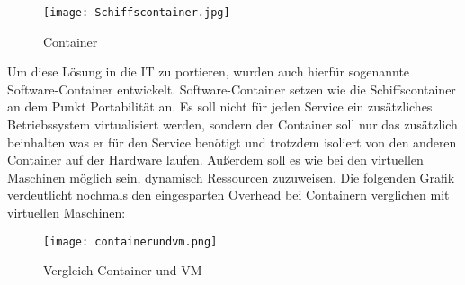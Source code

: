 \begin{figure}[H]
	\begin{center}
		\texttt{[image: Schiffscontainer.jpg]}
	\end{center}
	\caption[Container]{Container \footnotemark}
	\label{fig:HW1}
\end{figure}
Um diese Lösung in die IT zu portieren, wurden auch hierfür sogenannte Software-Container entwickelt.
Software-Container setzen wie die Schiffscontainer an dem Punkt Portabilität an. Es soll nicht für jeden Service ein zusätzliches Betriebssystem virtualisiert werden, sondern der Container soll nur das zusätzlich beinhalten was er für den Service benötigt und trotzdem isoliert von den anderen Container auf der Hardware laufen. Außerdem soll es wie bei den virtuellen Maschinen möglich sein, dynamisch Ressourcen zuzuweisen.\cite{12005068320161201,redhat} 
\newpage
Die folgenden Grafik verdeutlicht nochmals den eingesparten Overhead bei Containern verglichen mit virtuellen Maschinen: 
\begin{figure}[H]
	\begin{center}
		\texttt{[image: containerundvm.png]}
	\end{center}
	\caption[Vergleich Container und VM]{Vergleich Container und VM \footnotemark}
	\label{fig:VergleichContainerVM}
\end{figure}
\newpage


